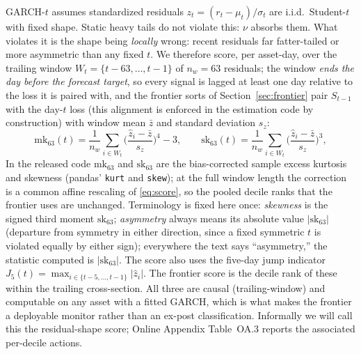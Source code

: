 \documentclass[11pt]{article}
\theoremstyle{remark}
\begin{document}
GARCH-$t$ assumes standardized residuals $z_t = (r_t - \mu_t)/\sigma_t$
are i.i.d.\ Student-$t$ with fixed shape. Static heavy tails do not violate this: $\nu$ absorbs them. What violates it is the shape being
\emph{locally} wrong: recent residuals far fatter-tailed or more
asymmetric than any fixed $t$. We therefore score, per asset-day, over
the trailing window $W_t = \{t-63,\dots,t-1\}$ of $n_w = 63$ residuals; the window \emph{ends the day before the forecast target}, so every signal is lagged at least one day relative to the loss it is paired with, and the frontier sorts of Section~\ref{sec:frontier} pair $S_{t-1}$ with the day-$t$ loss (this alignment is enforced in the estimation code by construction)
with window mean $\bar{z}$ and standard deviation $s_z$:
\begin{equation}
\mathrm{mk}_{63}(t) = \frac{1}{n_w}\sum_{i\in W_t}
\Big(\frac{\widehat{z}_i - \bar{z}}{s_z}\Big)^{4} - 3,
\qquad
\mathrm{sk}_{63}(t) = \frac{1}{n_w}\sum_{i\in W_t}
\Big(\frac{\widehat{z}_i - \bar{z}}{s_z}\Big)^{3},
\label{eq:score}
\end{equation}
In the released code $\mathrm{mk}_{63}$ and $\mathrm{sk}_{63}$ are the
bias-corrected sample excess kurtosis and skewness (pandas' \texttt{kurt}
and \texttt{skew}); at the full window length the correction is a common
affine rescaling of \eqref{eq:score}, so the pooled decile ranks that the
frontier uses are unchanged.
Terminology is fixed here once: \emph{skewness} is the signed third
moment $\mathrm{sk}_{63}$; \emph{asymmetry} always means its absolute
value $|\mathrm{sk}_{63}|$ (departure from symmetry in either
direction, since a fixed symmetric $t$ is violated equally by either
sign); everywhere the text says ``asymmetry,'' the statistic computed
is $|\mathrm{sk}_{63}|$. The score also uses the five-day jump indicator
$J_5(t) = \max_{i \in \{t-5,\dots,t-1\}} |\widehat{z}_i|$. The frontier
score is the decile rank of these within the trailing cross-section.
All three are causal (trailing-window) and computable on any asset with a fitted GARCH, which is what makes the frontier a deployable monitor
rather than an ex-post classification. Informally we will call this the
residual-shape score; Online Appendix Table~OA.3 reports the associated
per-decile actions.
\end{document}
